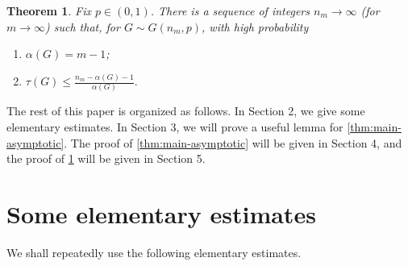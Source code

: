 \documentclass[11pt,reqno]{amsart}
\newtheorem{theorem}{Theorem}[section]
\newtheorem{lemma}[theorem]{Lemma}
\theoremstyle{definition}
\theoremstyle{remark}
\newcommand{\PP}{\mathbb P}
\begin{document}
\begin{theorem}\label{thm:exact-instability}
Fix $p\in(0,1)$.  There is a sequence of integers $n_m\to\infty$ (for $m\to\infty$) such that, for $G\sim G(n_m,p)$, with high probability
\begin{enumerate}[label=\textup{(\roman*)}]
 \item $\alpha(G)=m-1$;
 \item $
 \tau(G)\le \frac{n_m-\alpha(G)-1}{\alpha(G)}.
$
\end{enumerate}
\end{theorem}

The rest of this paper is organized as follows. In Section 2, we give some elementary estimates. 
 In Section 3, we will prove a useful lemma for \cref{thm:main-asymptotic}. The proof of \cref{thm:main-asymptotic} will be given in Section 4, and the proof of \cref{thm:exact-instability} will be given in Section 5.
 
 
 
 
 
 
\section{Some elementary estimates}

  We shall repeatedly use the following elementary estimates.  

\end{document}
